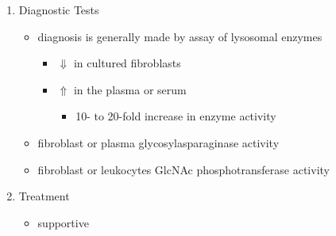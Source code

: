 \documentclass{scrartcl}
\begin{document}
\begin{enumerate}
\item Diagnostic Tests
\label{sec:org4b5c227}
\begin{itemize}
\item diagnosis is generally made by assay of lysosomal enzymes
\begin{itemize}
\item \(\Downarrow\) in cultured fibroblasts
\item \(\Uparrow\) in the plasma or serum
\begin{itemize}
\item 10- to 20-fold increase in enzyme activity
\end{itemize}
\end{itemize}
\item fibroblast or plasma glycosylasparaginase activity
\item fibroblast or leukocytes GlcNAc phosphotransferase activity
\end{itemize}

\item Treatment
\label{sec:org7626165}
\begin{itemize}
\item supportive
\end{itemize}
\end{enumerate}
\end{document}
